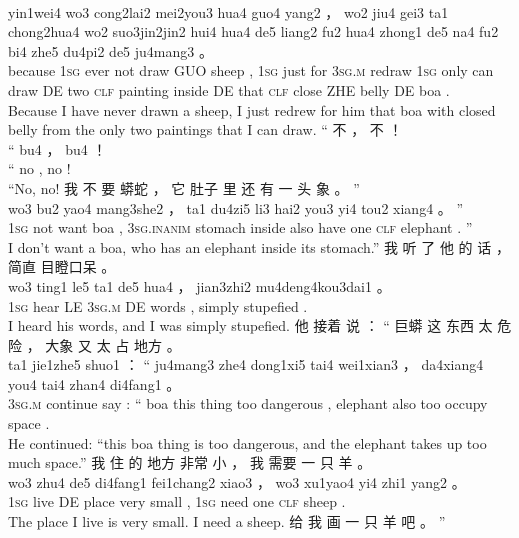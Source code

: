 \documentclass[UTF8]{ctexart}
\begin{document}
\begin{exe}
\\
yin1wei4 wo3 cong2lai2 mei2you3 hua4 guo4 yang2 ， wo2 jiu4 gei3 ta1 chong2hua4 wo2 suo3jin2jin2 hui4 hua4 de5 liang2 fu2 hua4 zhong1 de5 na4 fu2 bi4 zhe5 du4pi2 de5 ju4mang3 。
\\
because \textsc{1sg} ever not draw GUO sheep , \textsc{1sg} just for \textsc{3sg.m} redraw \textsc{1sg} only can draw DE two \textsc{clf} painting inside DE that \textsc{clf} close ZHE belly DE boa .
\\
\trans Because I have never drawn a sheep, I just redrew for him that boa with closed belly from the only two paintings that I can draw.
\ex
\glll
“ 不 ， 不 ！
\\
“ bu4 ， bu4 ！
\\
`` no , no !
\\
\trans ``No, no!
\ex
\glll
我 不 要 蟒蛇 ， 它 肚子 里 还 有 一 头 象 。 ”
\\
wo3 bu2 yao4 mang3she2 ， ta1 du4zi5 li3 hai2 you3 yi4 tou2 xiang4 。 ”
\\
\textsc{1sg} not want boa , \textsc{3sg.inanim} stomach inside also have one \textsc{clf} elephant . ''
\\
\trans I don't want a boa, who has an elephant inside its stomach.''
\ex
\glll
我 听 了 他 的 话 ， 简直 目瞪口呆 。
\\
wo3 ting1 le5 ta1 de5 hua4 ， jian3zhi2 mu4deng4kou3dai1 。
\\
\textsc{1sg} hear LE \textsc{3sg.m} DE words , simply stupefied .
\\
\trans I heard his words, and I was simply stupefied. 
\ex
\glll
他 接着 说 ： “ 巨蟒 这 东西 太 危险 ， 大象 又 太 占 地方 。
\\
ta1 jie1zhe5 shuo1  ： “ ju4mang3 zhe4 dong1xi5 tai4 wei1xian3 ， da4xiang4 you4 tai4 zhan4 di4fang1 。
\\
\textsc{3sg.m} continue say : `` boa this thing too dangerous , elephant also too occupy space . 
\\
\trans He continued: ``this boa thing is too dangerous, and the elephant takes up too much space.''
\ex
\glll
我 住 的 地方 非常 小 ， 我 需要 一 只 羊 。
\\
wo3 zhu4 de5 di4fang1 fei1chang2 xiao3 ， wo3 xu1yao4 yi4 zhi1 yang2 。
\\
\textsc{1sg} live DE place very small , \textsc{1sg} need one \textsc{clf} sheep .
\\
\trans The place I live is very small. I need a sheep.
\ex
\glll
给 我 画 一 只 羊 吧 。 ”
\\

\end{exe}
\end{document}
